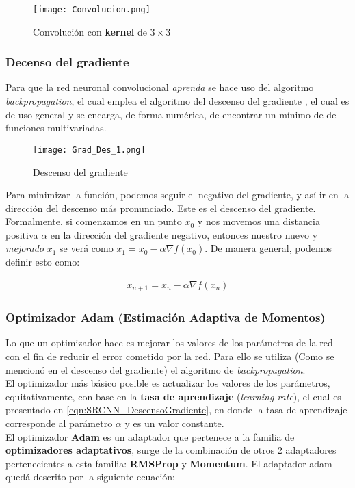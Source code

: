 \begin{figure}[H]
    \label{fig:SRCNN_Convolucion}
    \centering
    \texttt{[image: Convolucion.png]}
    \caption{Convolución con \textbf{kernel} de $3\times 3$}
\end{figure}

\subsubsection{Decenso del gradiente}
Para que la red neuronal convolucional \emph{aprenda} se hace uso del algoritmo \emph{backpropagation}, el cual emplea el
algoritmo del descenso del gradiente \cite{DescensoGradiente}, el cual es de uso general y se encarga, de forma numérica, de encontrar un mínimo de
de funciones multivariadas.\\

\begin{figure}[H]
    \label{fig:SRCNN_GradDescent}
    \centering
    \texttt{[image: Grad\_Des\_1.png]}
    \caption{Descenso del gradiente}
\end{figure}

Para minimizar la función, podemos seguir el negativo del gradiente, y así ir en la dirección del descenso más pronunciado.
Este es el descenso del gradiente. Formalmente, si comenzamos en un punto $x_0$ y nos movemos una distancia positiva $\alpha$
en la dirección del gradiente negativo, entonces nuestro nuevo y \emph{mejorado} $x_1$ se verá como $x_1=x_0-\alpha\nabla f(x_0)$.
De manera general, podemos definir esto como:

\begin{align}
    \label{eqn:SRCNN_DescensoGradiente}
    x_{n+1}=x_n-\alpha\nabla f(x_n)
\end{align}

\subsubsection{Optimizador Adam (Estimación Adaptiva de Momentos)}
Lo que un optimizador \cite{AdamOptimizador} hace es mejorar los valores de los parámetros de la red con el fin de reducir el error cometido por la red.
Para ello se utiliza (Como se mencionó en el descenso del gradiente) el algoritmo de \emph{backpropagation}.\\
El optimizador más básico posible es actualizar los valores de los parámetros, equitativamente, con base en la \textbf{tasa de
aprendizaje} (\emph{learning rate}), el cual es presentado en \eqref{eqn:SRCNN_DescensoGradiente}, en donde la tasa de aprendizaje
corresponde al parámetro \textbf{$\alpha$} y es un valor constante.\\
El optimizador \textbf{Adam} es un adaptador que pertenece a la familia de \textbf{optimizadores adaptativos}, surge de la
combinación de otros 2 adaptadores pertenecientes a esta familia: \textbf{RMSProp} y \textbf{Momentum}.
El adaptador adam quedá descrito por la siguiente ecuación:

